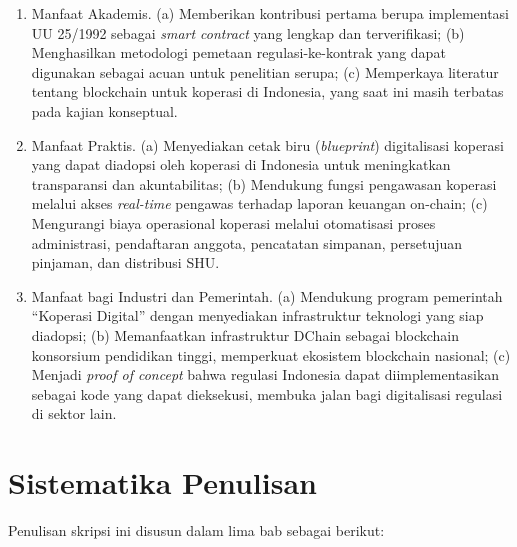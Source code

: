 \begin{enumerate}
	\item Manfaat Akademis. (a) Memberikan kontribusi pertama berupa implementasi UU 25/1992 sebagai \textit{smart contract} yang lengkap dan terverifikasi; (b) Menghasilkan metodologi pemetaan regulasi-ke-kontrak yang dapat digunakan sebagai acuan untuk penelitian serupa; (c) Memperkaya literatur tentang blockchain untuk koperasi di Indonesia, yang saat ini masih terbatas pada kajian konseptual.
	
	\item Manfaat Praktis. (a) Menyediakan cetak biru (\textit{blueprint}) digitalisasi koperasi yang dapat diadopsi oleh koperasi di Indonesia untuk meningkatkan transparansi dan akuntabilitas; (b) Mendukung fungsi pengawasan koperasi melalui akses \textit{real-time} pengawas terhadap laporan keuangan on-chain; (c) Mengurangi biaya operasional koperasi melalui otomatisasi proses administrasi, pendaftaran anggota, pencatatan simpanan, persetujuan pinjaman, dan distribusi SHU.
	
	\item Manfaat bagi Industri dan Pemerintah. (a) Mendukung program pemerintah ``Koperasi Digital'' dengan menyediakan infrastruktur teknologi yang siap diadopsi; (b) Memanfaatkan infrastruktur DChain sebagai blockchain konsorsium pendidikan tinggi, memperkuat ekosistem blockchain nasional; (c) Menjadi \textit{proof of concept} bahwa regulasi Indonesia dapat diimplementasikan sebagai kode yang dapat dieksekusi, membuka jalan bagi digitalisasi regulasi di sektor lain.
\end{enumerate}

\section{Sistematika Penulisan}

Penulisan skripsi ini disusun dalam lima bab sebagai berikut:

